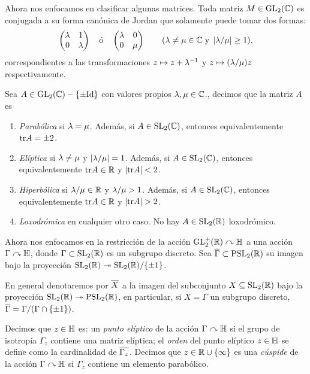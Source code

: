 Ahora nos enfocamos en clasificar algunas matrices. Toda matriz $M\in\mathrm{GL}_2(\mathbb{C})$ es conjugada
a su forma can\'onica de Jordan que solamente puede tomar dos formas:
\[
  \begin{pmatrix}\lambda & 1\\ 0 & \lambda\end{pmatrix} \quad\text{\'o}\quad \begin{pmatrix}\lambda & 0\\ 0 & \mu\end{pmatrix}\qquad
  (\lambda\neq\mu\in\mathbb{C}\;\text{y}\;\left| \lambda/\mu \right|\geq1),
\]
correspondientes a las transformaciones $z\mapsto z+\lambda^{-1}$ y $z\mapsto (\lambda/\mu)z$ respectivamente.

\begin{defin}
  Sea $A\in\mathrm{GL}_2(\mathbb{C})-\{\pm\mathrm{Id}\}$ con valores propios $\lambda,\mu\in\mathbb{C}$., decimos que la matriz $A$
  es
  \begin{enumerate}
  \item \emph{Parab\'olica} si $\lambda=\mu$. Adem\'as, si $A\in\mathrm{SL}_2(\mathbb{C})$, entonces equivalentemente
    $\mathrm{tr} A=\pm2$.
  \item \emph{El\'iptica} si $\lambda\neq\mu$ y $\left| \lambda/\mu \right|=1$.  Adem\'as, si $A\in\mathrm{SL}_2(\mathbb{C})$,
    entonces equivalentemente $\mathrm{tr} A\in\mathbb{R}$ y $\left| \mathrm{tr} A \right|<2$.
    \item \emph{Hiperb\'olica} si  $\lambda/\mu\in\mathbb{R}$ y $\lambda/\mu>1$. Adem\'as, si $A\in\mathrm{SL}_2(\mathbb{C})$,
      entonces equivalentemente $\mathrm{tr} A\in\mathbb{R}$ y $\abs{\tr A}>2$.
    \item \emph{Loxodr\'omica} en cualquier otro caso. No hay $A\in\mathrm{SL}_2(\mathbb{R})$ loxodr\'omico.
  \end{enumerate}
\end{defin}


Ahora nos enfocamos en la restricci\'on de la acci\'on $\mathrm{GL}_2^+(\mathbb{R})\curvearrowright\mathbb{H}$ a una acci\'on
$\Gamma\curvearrowright\mathbb{H}$, donde $\Gamma\subset\mathrm{SL}_2(\mathbb{R})$ es un subgrupo discreto.
Sea $\overline{\Gamma}\subset\mathrm{PSL}_2(\mathbb{R})$ su imagen
bajo la proyecci\'on $\mathrm{SL}_2(\mathbb{R})\twoheadrightarrow\mathrm{SL}_2(\mathbb{R})/\{\pm1\}$.

\begin{nota}
  En general denotaremos por $\overline{X}$ a la imagen del subconjunto $X\subseteq\mathrm{SL}_2(\mathbb{R})$ bajo la
  proyecci\'on $\mathrm{SL}_2(\mathbb{R})\twoheadrightarrow\mathrm{PSL}_2(\mathbb{R})$, en particular, si $X=\Gamma$ un subgrupo discreto,
  $\overline{\Gamma}=\Gamma/(\Gamma\cap\{\pm1\})$.
\end{nota}

\begin{defin}
  Decimos que $z\in\mathbb{H}$ es: un \emph{punto el\'iptico} de
  la acci\'on $\Gamma\curvearrowright\mathbb{H}$ si el grupo de isotrop\'ia $\Gamma_z$ contiene una matriz el\'iptica;
  el \emph{orden} del punto el\'iptico $z\in\mathbb{H}$ se define como la cardinalidad de $\overline{\Gamma_z}$.
  Decimos que $z\in\mathbb{R}\cup\{\infty\}$ es una \emph{c\'uspide} de la acci\'on $\Gamma\curvearrowright\mathbb{H}$ si
  $\Gamma_z$ contiene un elemento parab\'olico.
\end{defin}

